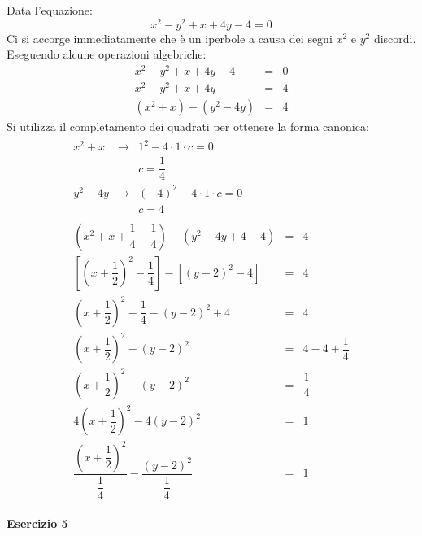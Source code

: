 \documentclass[a4paper]{article}
\newcommand{\example}[1]{\textcolor{Green4}{\textbf{#1}}}
\begin{document}
	\noindent
	Data l'equazione:
	\begin{equation*}
		x^{2} - y^{2} + x + 4y - 4 = 0
	\end{equation*}
	Ci si accorge immediatamente che è un iperbole a causa dei segni $x^{2}$ e $y^{2}$ discordi. Eseguendo alcune operazioni algebriche:
	\begin{equation*}
		\begin{array}{rcl}
			x^{2} - y^{2} + x + 4y - 4 &=& 0 \\ [.5em]
			x^{2} - y^{2} + x + 4y &=& 4 \\ [.5em]
			\left(x^{2}+x\right) - \left(y^{2} - 4y\right) &=& 4
		\end{array}
	\end{equation*}
	Si utilizza il completamento dei quadrati per ottenere la forma canonica:
	\begin{gather*}
		\begin{array}{rcl}
			x^{2}+x & \longrightarrow 	& 1^{2} - 4 \cdot 1 \cdot c = 0 \\ [.5em]
					&					& c = \dfrac{1}{4} \\ [1em]
			y^{2}-4y& \longrightarrow	& \left(-4\right)^{2} - 4 \cdot 1 \cdot c = 0 \\ [.5em]
					&					& c = 4
		\end{array} \\
		\begin{array}{rcl}
			\left(x^{2} + x + \dfrac{1}{4} - \dfrac{1}{4}\right) - \left(y^{2} - 4y + 4 - 4\right) &=& 4 \\ [1em]
			\left[\left(x+\dfrac{1}{2}\right)^{2} - \dfrac{1}{4}\right] - \left[\left(y-2\right)^{2} - 4\right] &=& 4 \\ [1em]
			\left(x+\dfrac{1}{2}\right)^{2} - \dfrac{1}{4} - \left(y-2\right)^{2} + 4 &=& 4 \\ [1em]
			\left(x+\dfrac{1}{2}\right)^{2} - \left(y-2\right)^{2} &=& 4 - 4 + \dfrac{1}{4} \\ [1em]
			\left(x+\dfrac{1}{2}\right)^{2} - \left(y-2\right)^{2} &=& \dfrac{1}{4} \\ [1em]
			4\left(x+\dfrac{1}{2}\right)^{2} - 4\left(y-2\right)^{2} &=& 1 \\ [1em]
			\dfrac{\left(x+\dfrac{1}{2}\right)^{2}}{\dfrac{1}{4}} - \dfrac{\left(y-2\right)^{2}}{\dfrac{1}{4}} &=& 1
		\end{array}
	\end{gather*}

	\newpage
	\begin{flushleft}
		\example{\underline{Esercizio 5}}
	\end{flushleft}
\end{document}
